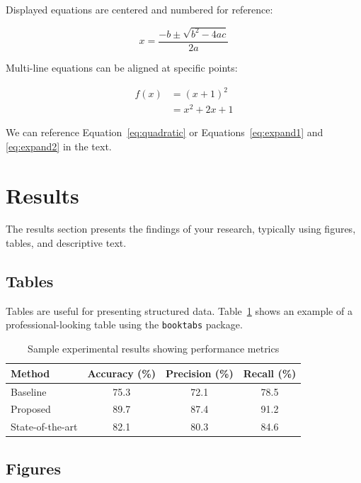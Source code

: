 \documentclass[12pt,a4paper]{article}
\begin{document}
Displayed equations are centered and numbered for reference:

\begin{equation}
\label{eq:quadratic}
x = \frac{-b \pm \sqrt{b^2 - 4ac}}{2a}
\end{equation}

Multi-line equations can be aligned at specific points:

\begin{align}
f(x) &= (x+1)^2 \label{eq:expand1} \\
     &= x^2 + 2x + 1 \label{eq:expand2}
\end{align}

We can reference Equation~\ref{eq:quadratic} or Equations~\ref{eq:expand1} and \ref{eq:expand2} in the text.

\section{Results}
\label{sec:results}

The results section presents the findings of your research, typically using figures, tables, and descriptive text.

\subsection{Tables}
\label{subsec:tables}

Tables are useful for presenting structured data. Table~\ref{tab:results} shows an example of a professional-looking table using the \texttt{booktabs} package.

\begin{table}[ht]
\centering
\caption{Sample experimental results showing performance metrics}
\label{tab:results}
\begin{tabular}{lccc}
\toprule
Method & Accuracy (\%) & Precision (\%) & Recall (\%) \\
\midrule
Baseline & 75.3 & 72.1 & 78.5 \\
Proposed & 89.7 & 87.4 & 91.2 \\
State-of-the-art & 82.1 & 80.3 & 84.6 \\
\bottomrule
\end{tabular}
\end{table}

\subsection{Figures}
\label{subsec:figures}
\end{document}

